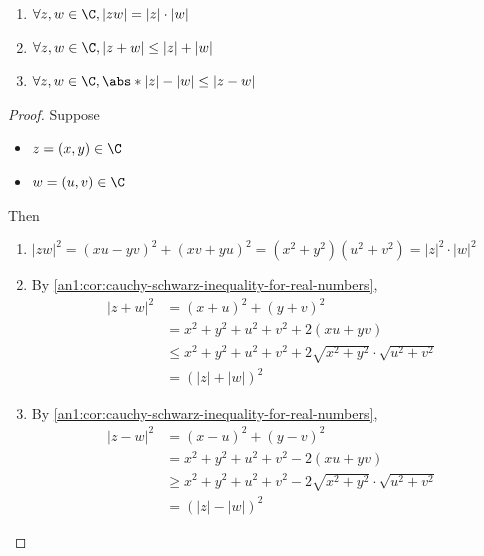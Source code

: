 \begin{theorem} \label{an1:thm:properties-of-modulus}
  \leavevmode\par
  \begin{enumerate}[label=\textbf{(\Alph*)}]
    \item $\forall z, w \in \C, |zw| = |z| \cdot |w|$
    \item $\forall z, w \in \C, |z + w| \leq |z| + |w|$
    \item $\forall z, w \in \C, \abs*{|z| - |w|} \leq |z - w|$
  \end{enumerate}
\end{theorem}

\begin{proof}
  Suppose
  \begin{itemize}
    \item $z = (x, y) \in \C$
    \item $w = (u, v) \in \C$
  \end{itemize}
  Then
  \begin{enumerate}[label=\textbf{(\Alph*)}]
    \item $|zw|^{2} = (xu - yv)^{2} + (xv + yu)^{2} = (x^{2} + y^{2})(u^{2} + v^{2}) = |z|^{2} \cdot |w|^{2}$
    \item By \cref{an1:cor:cauchy-schwarz-inequality-for-real-numbers},
          \begin{align*}
            |z + w|^{2} & = (x + u)^{2} + (y + v)^{2}                                                           \\
                        & = x^{2} + y^{2} + u^{2} + v^{2} + 2(xu + yv)                                          \\
                        & \leq x^{2} + y^{2} + u^{2} + v^{2} + 2\sqrt{x^{2} + y^{2}} \cdot \sqrt{u^{2} + v^{2}} \\
                        & = (|z| + |w|)^{2}
          \end{align*}
    \item By \cref{an1:cor:cauchy-schwarz-inequality-for-real-numbers},
          \begin{align*}
            |z - w|^{2} & = (x - u)^{2} + (y - v)^{2}                                                           \\
                        & = x^{2} + y^{2} + u^{2} + v^{2} - 2(xu + yv)                                          \\
                        & \geq x^{2} + y^{2} + u^{2} + v^{2} - 2\sqrt{x^{2} + y^{2}} \cdot \sqrt{u^{2} + v^{2}} \\
                        & = (|z| - |w|)^{2}
          \end{align*}
  \end{enumerate}
\end{proof}

